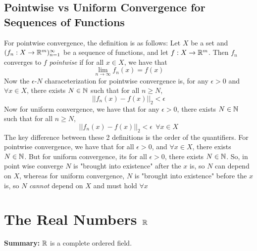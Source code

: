 \documentclass[openany]{report}
\begin{document}
\section*{Pointwise vs Uniform Convergence for Sequences of Functions}
For pointwise convergence, the definition is as follows: Let $X$ be a set and $(f_n: X \rightarrow \mathbb{R}^m)^\infty_{n=1}$ be a sequence of functions, and let $f: X \rightarrow \mathbb{R}^m$. Then $f_n$ converges to $f$ \emph{pointwise} if for all $x \in X$, we have that
\[\lim_{n\rightarrow\infty} f_n(x) = f(x)\]
Now the $\epsilon$-$N$ characeterization for pointwise convergence is, for any $\epsilon > 0$ and $\forall x \in X$, there exists $N \in \mathbb{N}$ such that for all $n \geq N$,\
\[||f_n(x) - f(x)||_2 < \epsilon\]
Now for uniform convergence, we have that for any $\epsilon > 0$, there exists $N \in \mathbb{N}$ such that for all $n \geq N$,
\[||f_n(x) - f(x)||_2 < \epsilon \ \ \forall x \in X\]
The key difference between these 2 definitions is the order of the quantifiers. For pointwise convergence, we have that for all $\epsilon > 0$, and $\forall x \in X$, there exists $N \in \mathbb{N}$. But for uniform convergence, its for all $\epsilon > 0$, there exists $N \in \mathbb{N}$. So, in point wise converge $N$ is "brought into existence" after the $x$ is, so $N$ can depend on $X$, whereas for uniform convergence, $N$ is "brought into existence" before the $x$ is, so $N$ \emph{cannot} depend on $X$ and must hold $\forall x$
\chapter{The Real Numbers $\mathbb{R}$}
\begin{center}
    \textbf{Summary:} $\mathbb{R}$ is a complete ordered field.
\end{center}
\end{document}
